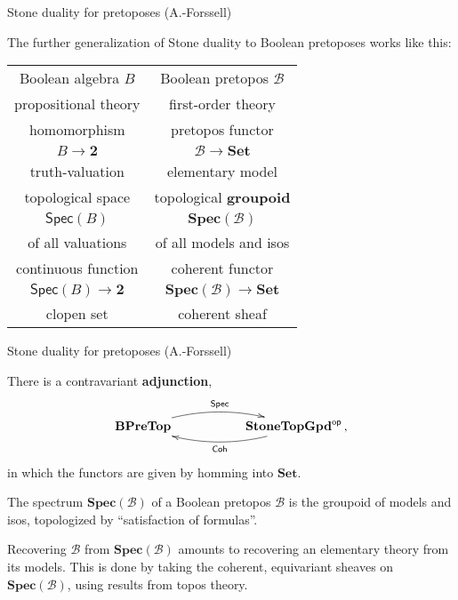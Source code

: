 \documentclass{beamer}
\newcommand{\myemph}[1]{\textbf{#1}}    %
\begin{document}
\begin{frame}{Stone duality for pretoposes (A.-Forssell)}

The further generalization of Stone duality to Boolean pretoposes works like this:
\medskip

\begin{center}
\begin{tabular}{c|c}
Boolean algebra $B$ & Boolean pretopos $\mathcal{B}$ \\
propositional theory & first-order theory \\
\hline homomorphism & pretopos functor\\
$B\to \mathbf{2}$ &  $\mathcal{B}\to \mathbf{Set}$ \\
truth-valuation & elementary model \\
\hline topological space & topological \myemph{groupoid} \\
 $\mathsf{Spec}(B)$ & $\mathbf{Spec}(\mathcal{B})$ \\
of all valuations & of all models and isos \\
\hline continuous function & coherent functor \\
$\mathsf{Spec}(B) \to \mathbf{2}$  & $\mathbf{Spec}(\mathcal{B}) \to \mathbf{Set}$\\
clopen set & coherent sheaf 
\end{tabular}
\end{center}

\end{frame}
\begin{frame}{Stone duality for pretoposes (A.-Forssell)}


\begin{theorem}[A.-Forssell 2008]
There is a contravariant \myemph{adjunction},
\[
\xymatrix{ 
\mathbf{BPreTop}  \ar@/{}^{1pc}/[rr]^{\mathsf{Spec}}     &&  \mathbf{StoneTopGpd}^{\mathsf{op}}  \ar@/{}^{1pc}/[ll]^{\mathsf{Coh}} \,,
} 
\]
in which the functors are given by homming into $\mathbf{Set}$.
\end{theorem}

The spectrum $\mathbf{Spec}(\mathcal{B})$ of a Boolean pretopos $\mathcal{B}$ is the groupoid of models and isos, topologized by ``satisfaction of formulas''.
\medskip

Recovering $\mathcal{B}$ from $\mathbf{Spec}(\mathcal{B})$ amounts to recovering an elementary theory from its models.  This is done by taking the coherent, equivariant sheaves on $\mathbf{Spec}(\mathcal{B})$, using results from topos theory.

\end{frame}
\end{document}
